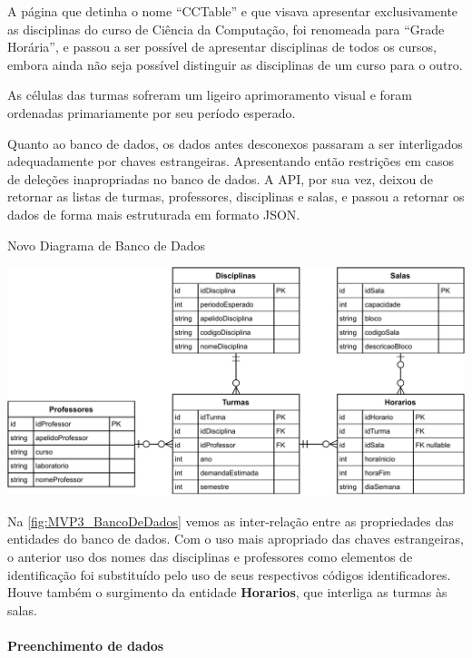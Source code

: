
A página que detinha o nome ``CCTable'' e que visava apresentar exclusivamente as disciplinas do curso de Ciência da Computação, foi renomeada para ``Grade Horária'', e passou a ser possível de apresentar disciplinas de todos os cursos, embora ainda não seja possível distinguir as disciplinas de um curso para o outro.

As células das turmas sofreram um ligeiro aprimoramento visual e foram ordenadas primariamente por seu período esperado.


Quanto ao banco de dados, os dados antes desconexos passaram a ser interligados adequadamente por chaves estrangeiras. Apresentando então restrições em casos de deleções inapropriadas no banco de dados. A API, por sua vez, deixou de retornar as listas de turmas, professores, disciplinas e salas, e passou a retornar os dados de forma mais estruturada em formato JSON.

\begin{MyCenteredFigure}
  \caption{Novo Diagrama de Banco de Dados}
  \label{fig:MVP3_BancoDeDados}
  \includegraphics[width=\textwidth]{files/img/2.02!5-desenvolvimento/2.02!5.1.4-sistema/Diagrama_ER-How_it_should_be.drawio}
\end{MyCenteredFigure}

Na \autoref{fig:MVP3_BancoDeDados} vemos as inter-relação entre as propriedades das entidades do banco de dados. Com o uso mais apropriado das chaves estrangeiras, o anterior uso dos nomes das disciplinas e professores como elementos de identificação foi substituído pelo uso de seus respectivos códigos identificadores. Houve também o surgimento da entidade \textbf{Horarios}, que interliga as turmas às salas.

\paragraph*{Preenchimento de dados}

